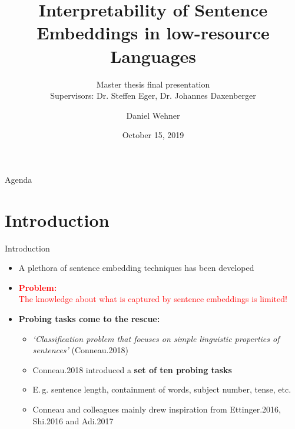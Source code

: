\documentclass[accentcolor=tud1a,colorbacktitle,inverttitle,landscape,german,presentation,t]{tudbeamer}
\begin{document}
\title[]{Interpretability of Sentence Embeddings in low-resource Languages}
\subtitle{Master thesis final presentation \\ Supervisors: Dr. Steffen Eger, Dr. Johannes Daxenberger}

\author{Daniel Wehner}
\date{October 15, 2019}

\begin{titleframe}
\end{titleframe}

\begin{frame}{Agenda}{}
	\tableofcontents
\end{frame}


\section{Introduction}

\begin{frame}{Introduction}{}
	\vspace*{-4mm}
	\begin{itemize}\setlength\itemsep{1em}
		\item A plethora of sentence embedding techniques has been developed
		\item \textcolor{red}{\textbf{Problem:}} \\
			\textcolor{red}{The knowledge about what is captured by sentence embeddings is limited!}
		\item \textbf{Probing tasks come to the rescue:}
		\begin{itemize}\setlength\itemsep{0.5em}
			\item \textit{`Classification problem that focuses on simple linguistic properties of sentences'} (Conneau.2018)
			\item Conneau.2018 introduced a \textbf{set of ten probing tasks}
			\item E.\,g. sentence length, containment of words, subject number, tense, etc.
			\item Conneau and colleagues mainly drew inspiration from Ettinger.2016, Shi.2016 and Adi.2017
		\end{itemize}
	\end{itemize}
\end{frame}
\end{document}
